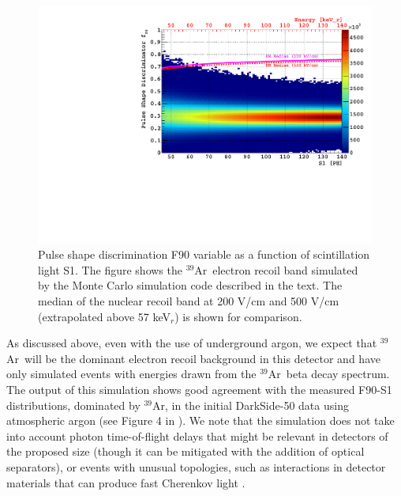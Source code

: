 \documentclass[a4paper,11pt]{article}
\newcommand{\artn}{$^{39}$Ar}
\begin{document}
\begin{figure}[ht]
\begin{centering}
\includegraphics[width=0.90\columnwidth]{Figures/f90_s1_3000ty_1pe.pdf}
\par\end{centering}
\caption{Pulse shape discrimination F90 variable as a function of scintillation light S1. The figure shows the \artn~electron recoil band simulated by the Monte Carlo simulation code described in the text. The median of the nuclear recoil band at 200 V/cm and 500 V/cm (extrapolated above 57 keV$_r$) is shown for comparison.  \label{fig:fnt_sim}}
\end{figure}

As discussed above, even with the use of underground argon, we expect that \artn~will be the dominant electron recoil background in this detector and have only simulated events with energies drawn from the \artn~beta decay spectrum. The output of this simulation shows good agreement with the measured F90-S1 distributions, dominated by \artn, in the initial DarkSide-50 data using atmospheric argon (see Figure 4 in \cite{agnes2015first}). We note that the simulation does not take into account photon time-of-flight delays that might be relevant in detectors of the proposed size (though it can be mitigated with the addition of optical separators), or events with unusual topologies, such as interactions in detector materials that can produce fast Cherenkov light \cite{agnes2018darkside, koh2018dark}. 
\end{document}
